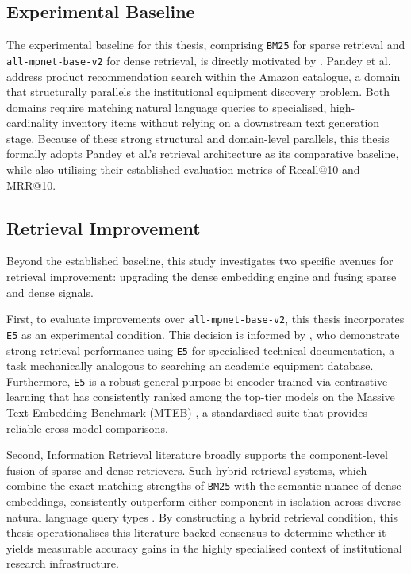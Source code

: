 \subsection{Experimental Baseline}

The experimental baseline for this thesis, comprising \texttt{BM25} for sparse retrieval and \texttt{all-mpnet-base-v2} for dense retrieval, is directly motivated by \citet{pandey2026domain}. Pandey et al. address product recommendation search within the Amazon catalogue, a domain that structurally parallels the institutional equipment discovery problem. Both domains require matching natural language queries to specialised, high-cardinality inventory items without relying on a downstream text generation stage. Because of these strong structural and domain-level parallels, this thesis formally adopts Pandey et al.'s retrieval architecture as its comparative baseline, while also utilising their established evaluation metrics of Recall@10 and MRR@10.

\subsection{Retrieval Improvement}

Beyond the established baseline, this study investigates two specific avenues for retrieval improvement: upgrading the dense embedding engine and fusing sparse and dense signals.

First, to evaluate improvements over \texttt{all-mpnet-base-v2}, this thesis incorporates \texttt{E5} \citep{wang2022text} as an experimental condition. This decision is informed by \citet{xu2024retrieval}, who demonstrate strong retrieval performance using \texttt{E5} for specialised technical documentation, a task mechanically analogous to searching an academic equipment database. Furthermore, \texttt{E5} is a robust general-purpose bi-encoder trained via contrastive learning that has consistently ranked among the top-tier models on the Massive Text Embedding Benchmark (MTEB) \citep{muennighoff2023mteb}, a standardised suite that provides reliable cross-model comparisons.

Second, Information Retrieval literature broadly supports the component-level fusion of sparse and dense retrievers. Such hybrid retrieval systems, which combine the exact-matching strengths of \texttt{BM25} with the semantic nuance of dense embeddings, consistently outperform either component in isolation across diverse natural language query types \citep{sharma2025retrieval}. By constructing a hybrid retrieval condition, this thesis operationalises this literature-backed consensus to determine whether it yields measurable accuracy gains in the highly specialised context of institutional research infrastructure.


